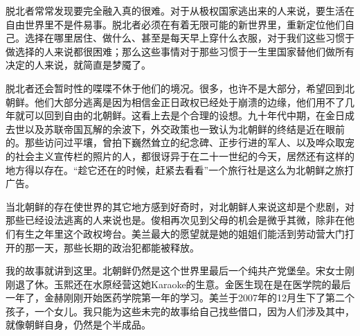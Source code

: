 脱北者常常发现要完全融入真的很难。对于从极权国家逃出来的人来说，要生活在自由世界里不是件易事。脱北者必须在有着无限可能的新世界里，重新定位他们自己。选择在哪里居住、做什么、甚至是每天早上穿什么衣服，对于我们这些习惯于做选择的人来说都很困难；那么这些事情对于那些习惯于一生里国家替他们做所有决定的人来说，就简直是梦魇了。

脱北者还会暂时性的喋喋不休于他们的境况。很多，也许不是大部分，希望回到北朝鲜。他们大部分逃离是因为相信金正日政权已经处于崩溃的边缘，他们用不了几年就可以回到自由的北朝鲜。这看上去是个合理的设想。九十年代中期，在金日成去世以及苏联帝国瓦解的余波下，外交政策也一致认为北朝鲜的终结是近在眼前的。那些访问过平壤，曾拍下巍然耸立的纪念碑、正步行进的军人、以及哗众取宠的社会主义宣传栏的照片的人，都很讶异于在二十一世纪的今天，居然还有这样的地方得以存在。“趁它还在的时候，赶紧去看看”一个旅行社是这么为北朝鲜之旅打广告。

当北朝鲜的存在使世界的其它地方感到好奇时，对北朝鲜人来说这却是个悲剧，对那些已经设法逃离的人来说也是。俊相再次见到父母的机会是微乎其微，除非在他们有生之年里这个政权垮台。美兰最大的愿望就是她的姐姐们能活到劳动营大门打开的那一天，那些长期的政治犯都能被释放。

我的故事就讲到这里。北朝鲜仍然是这个世界里最后一个纯共产党堡垒。宋女士刚刚退了休。玉熙还在水原经营这她Karaoke的生意。金医生现在是在医学院的最后一年了，金赫刚刚开始医药学院第一年的学习。美兰于2007年的12月生下了第二个孩子，一个女儿。我只能为这些未完的故事给自己找些借口，因为人们涉及其中，就像朝鲜自身，仍然是个半成品。
